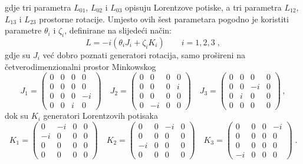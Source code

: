 gdje tri parametra $L_{01}$, $L_{02}$ i $L_{03}$ opisuju Lorentzove
potiske, a tri parametra $L_{12}$, $L_{13}$ i $L_{23}$ prostorne rotacije.
Umjesto ovih šest parametara pogodno je koristiti parametre
$\theta_i$ i $\zeta_i$,  definirane na slijedeći način:
\begin{equation}
 L = -i (\theta_i J_i + \zeta_i K_i)  \qquad i=1,2,3  \;,
\label{eq:LJK}
\end{equation}
gdje su $J_i$ već dobro poznati generatori rotacija, samo prošireni
na četverodimenzionalni prostor Minkowskog
\begin{equation}
 J_1 =
\begin{pmatrix}
0 & 0 & 0 & 0 \\
0 & 0 & 0 & 0 \\
0 & 0 & 0 & -i \\
0 & 0 & i & 0
\end{pmatrix} \quad
 J_2 =
\begin{pmatrix}
0 & 0 & 0 & 0 \\
0 & 0 & 0 & i \\
0 & 0 & 0 & 0 \\
0 & -i & 0 & 0
\end{pmatrix} \quad
J_3 =
\begin{pmatrix}
0 & 0 & 0 & 0 \\
0 & 0 & -i & 0 \\
0 & i & 0 & 0 \\
0 & 0 & 0 & 0
\label{eq:defJi}
\end{pmatrix} \,,
\end{equation}
dok su $K_i$ generatori Lorentzovih potisaka
\begin{equation}
K_1 =
\begin{pmatrix}
0 & -i & 0 & 0 \\
-i & 0 & 0 & 0 \\
0 & 0 & 0 & 0 \\
0 & 0 & 0 & 0
\end{pmatrix} \quad
K_2=
\begin{pmatrix}
0 & 0 & -i & 0 \\
0 & 0 & 0 & 0 \\
-i & 0 & 0 & 0 \\
0 & 0 & 0 & 0
\end{pmatrix} \quad
K_3 =
\begin{pmatrix}
0 & 0 & 0 & -i \\
0 & 0 & 0 & 0 \\
0 & 0 & 0 & 0 \\
-i & 0 & 0 & 0
\end{pmatrix} \;.
\label{eq:defKi}
\end{equation}

